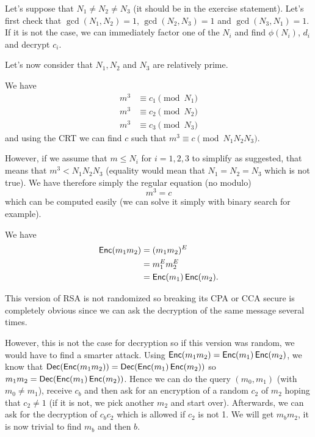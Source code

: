 \begin{solution}
  Let's suppose that $N_1 \neq N_2 \neq N_3$ (it should be in the exercise statement).
  Let's first check that $\gcd(N_1,N_2) = 1$, $\gcd(N_2,N_3) = 1$ and $\gcd(N_3,N_1) = 1$.
  If it is not the case, we can immediately factor one of the $N_i$ and find $\phi(N_i)$, $d_i$ and decrypt $c_i$.

  Let's now consider that $N_1, N_2$ and $N_3$ are relatively prime.

  We have
  \begin{align*}
    m^3 & \equiv c_1 \pmod{N_1}\\
    m^3 & \equiv c_2 \pmod{N_2}\\
    m^3 & \equiv c_3 \pmod{N_3}
  \end{align*}
  and using the CRT we can find $c$ such that $m^3 \equiv c \pmod{N_1N_2N_3}$.

  However, if we assume that $m \leq N_i$ for $i = 1, 2, 3$ to simplify as suggested,
  that means that $m^3 < N_1N_2N_3$ (equality would mean that $N_1=N_2=N_3$ which is not true).
  We have therefore simply the regular equation (no modulo)
  \[ m^3 = c \]
  which can be computed easily (we can solve it simply with binary search for example).
\end{solution}

\begin{solution}
  We have
  \begin{align*}
    \operatorname{\mathsf{Enc}}(m_1m_2)
    & = (m_1m_2)^E\\
    & = m_1^Em_2^E\\
    & = \operatorname{\mathsf{Enc}}(m_1)\operatorname{\mathsf{Enc}}(m_2).
  \end{align*}

  This version of RSA is not randomized so breaking its CPA or CCA secure is completely obvious since we can ask
  the decryption of the same message several times.

  However, this is not the case for decryption so if this version was random, we would have to find a smarter attack.
  Using $\operatorname{\mathsf{Enc}}(m_1 m_2) = \operatorname{\mathsf{Enc}}(m_1)\operatorname{\mathsf{Enc}}(m_2)$, we know that $\operatorname{\mathsf{Dec}}(\operatorname{\mathsf{Enc}}(m_1 m_2)) = \operatorname{\mathsf{Dec}}(\operatorname{\mathsf{Enc}}(m_1)\operatorname{\mathsf{Enc}}(m_2))$ so
  $m_1 m_2 = \operatorname{\mathsf{Dec}}(\operatorname{\mathsf{Enc}}(m_1)\operatorname{\mathsf{Enc}}(m_2))$.
  Hence we can do the query $(m_0,m_1)$ (with $m_0 \neq m_1$), receive $c_b$ and then ask for an encryption of a random $c_2$ of $m_2$ hoping that $c_2 \neq 1$ (if it is not, we pick another $m_2$ and start over).
  Afterwards, we can ask for the decryption of $c_bc_2$ which is allowed if $c_2$ is not 1.
  We will get $m_bm_2$, it is now trivial to find $m_b$ and then $b$.
\end{solution}


